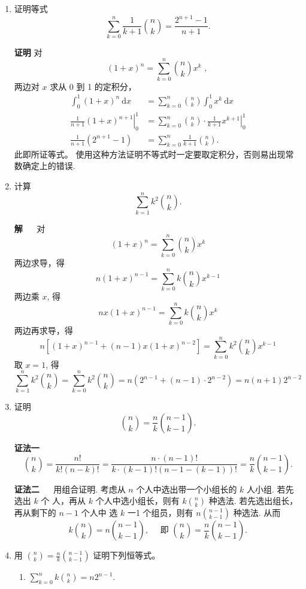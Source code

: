 \documentclass[a4paper,12pt]{ctexart}
\begin{document}
\begin{enumerate}
	\item  证明等式$$\sum_{k=0}^{n} \frac{1}{k+1} \binom{n}{k}   =\frac{2^{n+1}-1}{n+1}.$$

		\textbf{ 证明 } \quad 对
	$$
(1+x)^{n}=\sum_{k=0}^{n}\binom{n}{k} x^{k} \text { , }
	$$
	两边对 $x$ 求从 0 到 1 的定积分，
	\begin{align*}
		\int_{0}^{1}(1+x)^{n} \mathrm{~d} x & =\sum_{k=0}^{n}\binom{n}{k} \int_{0}^{1} x^{k} \mathrm{~d} x \\
		\left.\frac{1}{n+1}(1+x)^{n+1}\right|_{0} ^{1} & =\left.\sum_{k=0}^{n}\binom{n}{k} \cdot \frac{1}{k+1} x^{k+1}\right|_{0} ^{1} \\
		\frac{1}{n+1}\left(2^{n+1}-1\right) & =\sum_{k=0}^{n} \frac{1}{k+1}\binom{n}{k} .
	\end{align*}
	此即所证等式。
	使用这种方法证明不等式时一定要取定积分，否则易出现常数确定上的错误.


	\item
	计算 $$\sum_{k=1}^{n} k^{2}\binom{n}{k} .$$

	\textbf{解}  $\quad$ 对$$
	(1+x)^{n}=\sum_{k=0}^{n} \binom{n}{k}  x^{k}
	$$两边求导，得
	$$
	n(1+x)^{n-1}=\sum_{k=0}^{n} k\binom{n}{k}x^{k-1}
	$$
	两边乘 $x$, 得
	$$
	n x(1+x)^{n-1}=\sum_{k=0}^{n} k  \binom{n}{k}  x^{k}
	$$
	两边再求导，得
	$$
	n\left[(1+x)^{n-1}+(n-1) x(1+x)^{n-2}\right]=\sum_{k=0}^{n} k^{2}\binom{n}{k} x^{k-1}
	$$
	取 $x=1$, 得
	$$
	\sum_{k=1}^{n} k^{2} \binom{n}{k} =\sum_{k=0}^{n} k^{2} \binom{n}{k}
	=n\left(2^{n-1}+(n-1) \cdot 2^{n-2}\right)=n(n+1) 2^{n-2}
	$$



\item
证明 $$\binom{n}{k}=\frac{n}{k}\binom{n-1}{k-1}.$$


\textbf{证法一}$\quad$
$$\binom{n}{k}
=\frac{n !}{k !(n-k) !}=\frac{n \cdot(n-1) !}{k \cdot(k-1) !\left(n-1-(k-1) \right) !}=\frac{n}{k}  \binom{n-1}{k-1}.$$


\textbf{证法二} $\quad$ 用组合证明. 考虑从 $n$ 个人中选出带一个小组长的 $k$ 人小组. 若先选出 $k$ 个
人，再从 $k$ 个人中选小组长，则有 $k \binom{n}{k}$ 种选法. 若先选出组长，再从剩下的 $n-1$ 个人中
选 $k$ 一1 个组员，则有 $n \binom{n-1}{k-1}$ 种选法. 从而
$$
k\binom{n}{k}=n \binom{n-1}{k-1}, \quad
\text { 即 }\binom{n}{k}=\frac{n}{k}\binom{n-1}{k-1}.
$$


\item 用 $\binom{n}{k}=\frac{n}{k}\binom{n-1}{k-1}$ 证明下列恒等式。
\begin{enumerate}
 \item  $\sum_{k=0}^{n} k \binom{n}{k}  =n 2^{n-1}$.


\end{enumerate}
\end{enumerate}
\end{document}

